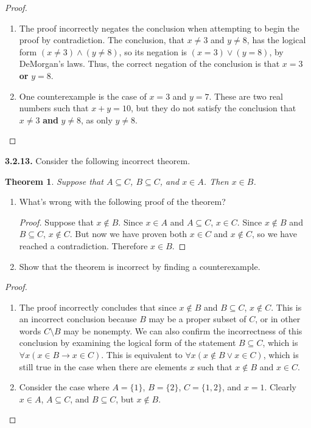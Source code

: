 \documentclass[12pt]{amsart}
\newenvironment{statement}[1]{\smallskip\noindent\color[rgb]{.6627, .3529, .6314} {\bf #1.}}{}
\newtheorem{theorem}{Theorem}
\theoremstyle{definition}
\theoremstyle{remark}
\begin{document}
\begin{proof}
\hfill
\begin{enumerate}
	\item The proof incorrectly negates the conclusion when attempting to begin the proof
	by contradiction.
	The conclusion, that $x \neq 3$ and $y \neq 8$, has the logical form 
	$(x \neq 3) \wedge (y \neq 8)$, so its negation is $(x = 3) \vee (y = 8)$, by DeMorgan's laws.
	Thus, the correct negation of the conclusion is that $x = 3$ \textbf{or} $y = 8$.
	
	\item One counterexample is the case of $x = 3$ and $y = 7$.
	These are two real numbers such that $x + y = 10$, but they do not satisfy the conclusion
	that $x \neq 3$ \textbf{and} $y \neq 8$, as only $y \neq 8$.
\end{enumerate}
\end{proof}


\begin{statement}{3.2.13}
Consider the following incorrect theorem.
\begin{theorem}
	Suppose that $A \subseteq C$, $B \subseteq C$, and $x \in A$.
	Then $x \in B$.
\end{theorem}
\begin{enumerate}
	\item What's wrong with the following proof of the theorem?
	\begin{proof}
		Suppose that $x \notin B$.
		Since $x \in A$ and $A \subseteq C$, $x \in C$.
		Since $x \notin B$ and $B \subseteq C$, $x \notin C$.
		But now we have proven both $x \in C$ and $x \notin C$,
		so we have reached a contradiction.
		Therefore $x \in B$.
	\end{proof}
	
	\item Show that the theorem is incorrect by finding a counterexample.
\end{enumerate}
\end{statement}

\begin{proof}
\hfill
\begin{enumerate}
	\item The proof incorrectly concludes that since $x \notin B$ and $B \subseteq C$, $x \notin C$.
	This is an incorrect conclusion because $B$ may be a proper subset of $C$,
	or in other words $C \setminus B$ may be nonempty.
	We can also confirm the incorrectness of this conclusion by examining the logical form of
	the statement $B \subseteq C$, which is $\forall x (x \in B \rightarrow x \in C)$.
	This is equivalent to $\forall x (x \notin B \vee x \in C)$, which is still true in the case
	when there are elements $x$ such that $x \notin B$ and $x \in C$.
	
	\item Consider the case where $A = \{ 1 \}$, $B = \{ 2 \}$, $C = \{ 1, 2 \}$, and $x = 1$.
	Clearly $x \in A$, $A \subseteq C$, and $B \subseteq C$, but $x \notin B$.
\end{enumerate}
\end{proof}
\end{document}
